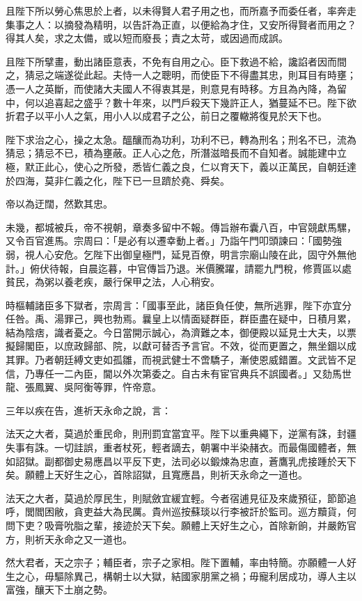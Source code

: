 \begin{pinyinscope}
且陛下所以勞心焦思於上者，以未得賢人君子用之也，而所嘉予而委任者，率奔走集事之人：以摘發為精明，以告訐為正直，以便給為才住，又安所得賢者而用之？得其人矣，求之太備，或以短而廢長；責之太苛，或因過而成誤。

且陛下所擘畫，動出諸臣意表，不免有自用之心。臣下救過不給，讒諂者因而間之，猜忌之端遂從此起。夫恃一人之聰明，而使臣下不得盡其忠，則耳目有時壅；憑一人之英斷，而使諸大夫國人不得衷其是，則意見有時移。方且為內降，為留中，何以追喜起之盛乎？數十年來，以門戶殺天下幾許正人，猶蔓延不已。陛下欲折君子以平小人之氣，用小人以成君子之公，前日之覆轍將復見於天下也。

陛下求治之心，操之太急。醞釀而為功利，功利不已，轉為刑名；刑名不已，流為猜忌；猜忌不已，積為壅蔽。正人心之危，所潛滋暗長而不自知者。誠能建中立極，默正此心，使心之所發，悉皆仁義之良，仁以育天下，義以正萬民，自朝廷達於四海，莫非仁義之化，陛下已一旦躋於堯、舜矣。

帝以為迂闊，然歎其忠。

未幾，都城被兵，帝不視朝，章奏多留中不報。傳旨辦布囊八百，中官競獻馬騾，又令百官進馬。宗周曰：「是必有以遷幸動上者。」乃詣午門叩頭諫曰：「國勢強弱，視人心安危。乞陛下出御皇極門，延見百僚，明言宗廟山陵在此，固守外無他計。」俯伏待報，自晨迄暮，中官傳旨乃退。米價騰躍，請罷九門稅，修賈區以處貧民，為粥以養老疾，嚴行保甲之法，人心稍安。

時樞輔諸臣多下獄者，宗周言：「國事至此，諸臣負任使，無所逃罪，陛下亦宜分任咎。禹、湯罪己，興也勃焉。曩皇上以情面疑群臣，群臣盡在疑中，日積月累，結為陰痞，識者憂之。今日當開示誠心，為濟難之本，御便殿以延見士大夫，以票擬歸閣臣，以庶政歸部、院，以獻可替否予言官。不效，從而更置之，無坐錮以成其罪。乃者朝廷縛文吏如孤雛，而視武健士不啻驕子，漸使恩威錯置。文武皆不足信，乃專任一二內臣，閫以外次第委之。自古未有宦官典兵不誤國者。」又劾馬世龍、張鳳翼、吳阿衡等罪，忤帝意。

三年以疾在告，進祈天永命之說，言：

法天之大者，莫過於重民命，則刑罰宜當宜平。陛下以重典繩下，逆黨有誅，封疆失事有誅。一切詿誤，重者杖死，輕者謫去，朝署中半染赭衣。而最傷國體者，無如詔獄。副都御史易應昌以平反下吏，法司必以鍛煉為忠直，蒼鷹乳虎接踵於天下矣。願體上天好生之心，首除詔獄，且寬應昌，則祈天永命之一道也。

法天之大者，莫過於厚民生，則賦斂宜緩宜輕。今者宿逋見征及來歲預征，節節追呼，閭閻困敝，貪吏益大為民厲。貴州巡按蘇琰以行李被訐於監司。巡方黷貨，何問下吏？吸膏吮脂之輩，接迹於天下矣。願體上天好生之心，首除新餉，并嚴飭官方，則祈天永命之又一道也。

然大君者，天之宗子；輔臣者，宗子之家相。陛下置輔，率由特簡。亦願體一人好生之心，毋驅除異己，構朝士以大獄，結國家朋黨之禍；毋寵利居成功，導人主以富強，釀天下土崩之勢。


\end{pinyinscope}
